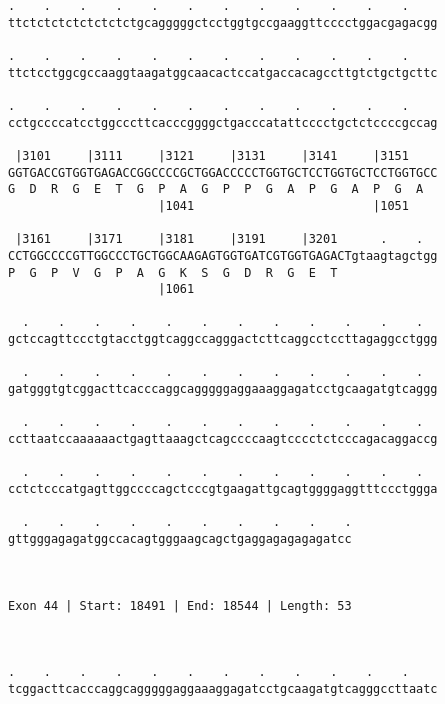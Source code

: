 \documentclass{article}
\begin{document}
\begin{Verbatim}
.    .    .    .    .    .    .    .    .    .    .    .    
ttctctctctctctctctgcagggggctcctggtgccgaaggttcccctggacgagacgg
                                                            
.    .    .    .    .    .    .    .    .    .    .    .    
ttctcctggcgccaaggtaagatggcaacactccatgaccacagccttgtctgctgcttc
                                                            
.    .    .    .    .    .    .    .    .    .    .    .    
cctgccccatcctggcccttcacccggggctgacccatattcccctgctctccccgccag
                                                            
 |3101     |3111     |3121     |3131     |3141     |3151    
GGTGACCGTGGTGAGACCGGCCCCGCTGGACCCCCTGGTGCTCCTGGTGCTCCTGGTGCC
G  D  R  G  E  T  G  P  A  G  P  P  G  A  P  G  A  P  G  A  
                     |1041                         |1051    
  
 |3161     |3171     |3181     |3191     |3201      .    .  
CCTGGCCCCGTTGGCCCTGCTGGCAAGAGTGGTGATCGTGGTGAGACTgtaagtagctgg
P  G  P  V  G  P  A  G  K  S  G  D  R  G  E  T              
                     |1061                                  
  
  .    .    .    .    .    .    .    .    .    .    .    .  
gctccagttccctgtacctggtcaggccagggactcttcaggcctccttagaggcctggg
                                                            
  .    .    .    .    .    .    .    .    .    .    .    .  
gatgggtgtcggacttcacccaggcagggggaggaaaggagatcctgcaagatgtcaggg
                                                            
  .    .    .    .    .    .    .    .    .    .    .    .  
ccttaatccaaaaaactgagttaaagctcagccccaagtcccctctcccagacaggaccg
                                                            
  .    .    .    .    .    .    .    .    .    .    .    .  
cctctcccatgagttggccccagctcccgtgaagattgcagtggggaggtttccctggga
                                                            
  .    .    .    .    .    .    .    .    .    .
gttgggagagatggccacagtgggaagcagctgaggagagagagatcc
                                                
                                                
 
Exon 44 | Start: 18491 | End: 18544 | Length: 53



.    .    .    .    .    .    .    .    .    .    .    .    
tcggacttcacccaggcagggggaggaaaggagatcctgcaagatgtcagggccttaatc
                                                            

\end{Verbatim}
\end{document}
